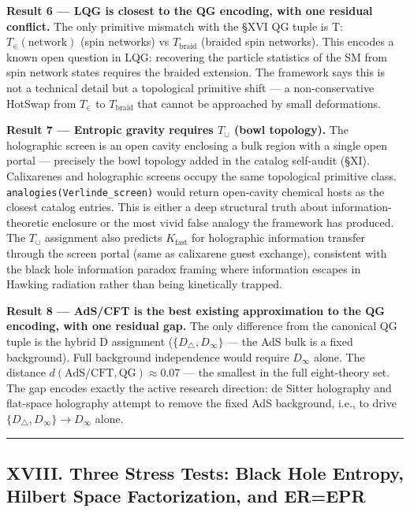\documentclass[12pt,a4paper]{article}
\begin{document}
\textbf{Result 6 --- LQG is closest to the QG encoding, with one residual conflict.} The only primitive mismatch with the §XVI QG tuple is T: $T_{\in}(\text{network})$ (spin networks) vs $T_{\text{braid}}$ (braided spin networks). This encodes a known open question in LQG: recovering the particle statistics of the SM from spin network states requires the braided extension. The framework says this is not a technical detail but a topological primitive shift --- a non-conservative HotSwap from $T_{\in}$ to $T_{\text{braid}}$ that cannot be approached by small deformations.

\textbf{Result 7 --- Entropic gravity requires $T_{\cup}$ (bowl topology).} The holographic screen is an open cavity enclosing a bulk region with a single open portal --- precisely the bowl topology added in the catalog self-audit (§XI). Calixarenes and holographic screens occupy the same topological primitive class. \texttt{analogies(Verlinde\_screen)} would return open-cavity chemical hosts as the closest catalog entries. This is either a deep structural truth about information-theoretic enclosure or the most vivid false analogy the framework has produced. The $T_{\cup}$ assignment also predicts $K_{\text{fast}}$ for holographic information transfer through the screen portal (same as calixarene guest exchange), consistent with the black hole information paradox framing where information escapes in Hawking radiation rather than being kinetically trapped.

\textbf{Result 8 --- AdS/CFT is the best existing approximation to the QG encoding, with one residual gap.} The only difference from the canonical QG tuple is the hybrid D assignment ($\{D_{\triangle}, D_{\infty}\}$ --- the AdS bulk is a fixed background). Full background independence would require $D_{\infty}$ alone. The distance $d(\text{AdS/CFT}, \text{QG}) \approx 0.07$ --- the smallest in the full eight-theory set. The gap encodes exactly the active research direction: de Sitter holography and flat-space holography attempt to remove the fixed AdS background, i.e., to drive $\{D_{\triangle}, D_{\infty}\} \to D_{\infty}$ alone.

\begin{center}
\rule{0.5\textwidth}{0.4pt}
\end{center}

\subsection{XVIII. Three Stress Tests: Black Hole Entropy, Hilbert Space Factorization, and ER=EPR}
\end{document}
